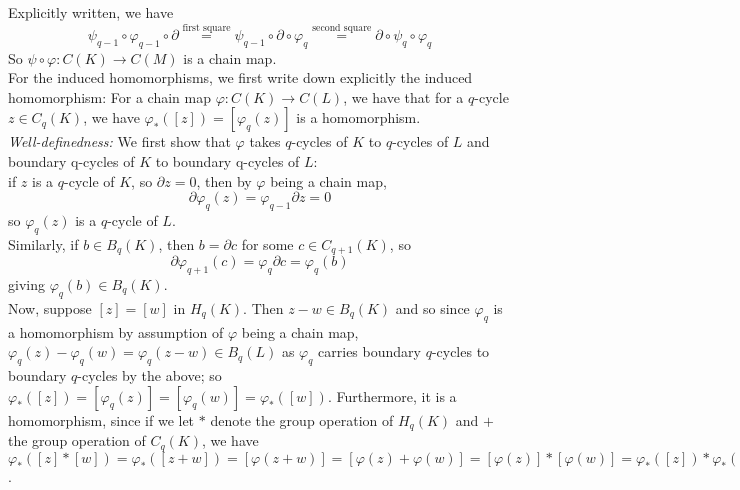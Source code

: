 \documentclass[a4paper]{article}
\begin{document}
    Explicitly written, we have
    \[
    \psi_{q-1} \circ \varphi_{q-1} \circ \partial
    \stackrel{\text{first square}}{=} \psi_{q-1} \circ \partial \circ \varphi_{q}
    \stackrel{\text{second square}}{=} \partial \circ \psi_q \circ \varphi_q
    \] 
    So $\psi \circ \varphi  \colon C(K) \to C(M)$ is a chain map.\\
    \linebreak
    For the induced homomorphisms, we first write down explicitly the induced
    homomorphism:
    For a chain map $\varphi  \colon C(K) \to C(L)$, we have that
    for a $q$-cycle $z \in C_q(K)$, we have
    $\varphi_* \left( \left[ z \right]  \right) 
    = \left[ \varphi_q (z) \right] $ is a homomorphism.\\
    \textit{Well-definedness:} We first show that $\varphi$ takes
    $q$-cycles of $K$ to $q$-cycles of $L$ and boundary q-cycles of $K$ to
    boundary q-cycles of $L$:\\
    if $z$ is a $q$-cycle of $K$, so $\partial z = 0$, then by $\varphi$ being
    a chain map,
    \[
    \partial \varphi_q (z) = \varphi_{q-1} \partial z = 0
    \] 
    so $\varphi_q (z)$ is a $q$-cycle of $L$.\\
    Similarly, if $b \in B_q(K)$, then $b = \partial c$ for some
    $c \in C_{q+1}(K)$, so
    \[
    \partial \varphi_{q+1}(c) = 
    \varphi_{q} \partial c = \varphi_{q} (b)
    \] 
    giving $\varphi_q (b) \in B_q(K)$.\\
    \linebreak
    Now, suppose 
    $\left[ z \right] = \left[ w \right] $
    in $H_q(K)$. Then
    $z-w \in B_q(K)$ and so since $\varphi_q$ is a homomorphism by assumption
    of $\varphi$ being a chain map,
    $\varphi_q (z) - \varphi_q (w) =  \varphi_q (z-w) \in B_q(L)$ as
    $\varphi_q$ carries boundary $q$-cycles to boundary $q$-cycles by the
    above; so
    $\varphi_* \left( \left[ z \right]  \right) 
    = \left[ \varphi_q (z) \right] =
    \left[ \varphi_q (w) \right] 
    = \varphi_* \left( \left[ w \right]  \right) $. Furthermore, it is
    a homomorphism, since if we let $*$ denote the group operation of
    $H_q(K)$ and $+$ the group operation of $C_q(K)$, we have
    $\varphi_* \left( \left[ z \right] * \left[ w \right]  \right) 
    = \varphi_* \left( \left[ z+w \right]  \right) 
    = \left[ \varphi (z+w) \right] 
    = \left[ \varphi(z) + \varphi(w) \right] 
    = \left[ \varphi(z) \right] *
    \left[ \varphi(w) \right] 
    = \varphi_* \left( \left[ z \right]  \right) 
    * \varphi_* \left( \left[ w \right]  \right) $.\\
\end{document}
